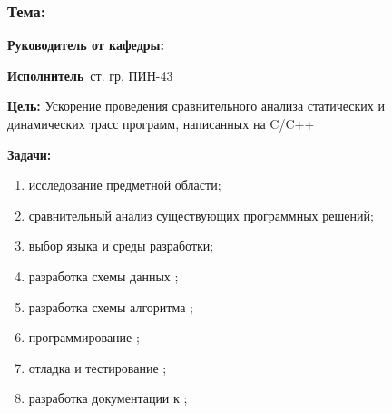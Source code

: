 
\begin{frame}
\frametitle{\textbf{Тема:~\thesisTitle}}
\textbf{Руководитель от кафедры:}~\supervisorRegaliaShort~\supervisorFioShort

\textbf{Исполнитель}~ст. гр. ПИН-43~\thesisAuthorShort

\textbf{Цель:} Ускорение проведения сравнительного анализа статических и динамических трасс программ, написанных на C/C++

\textbf{Задачи:}
\begin{enumerate}
    \item исследование предметной области;
    \item сравнительный анализ существующих программных решений;
    \item выбор языка и среды разработки;
    \item разработка схемы данных {\ProgModule};
    \item разработка схемы алгоритма {\ProgModule};
    \item программирование {\ProgModule};
    \item отладка и тестирование {\ProgModule};
    \item разработка документации к {\ProgModule};
\end{enumerate}
\end{frame}
%
%
%
%
%
